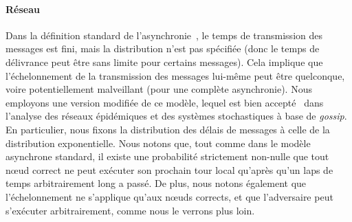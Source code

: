 \documentclass[letterpaper,twocolumn,10pt]{article}
\theoremstyle{definition}
\begin{document}
\paragraph{Réseau} 
Dans la définition standard de l'asynchronie~\cite{ben1983another}, le temps de transmission des messages est fini, mais la distribution n'est pas spécifiée (donc le temps de délivrance peut être sans limite pour certains messages). Cela implique que l'échelonnement de la transmission des messages lui-même peut être quelconque, voire potentiellement malveillant (pour une complète asynchronie).
Nous employons une version modifiée de ce modèle, lequel est bien accepté~\cite{banerjee2014epidemic, ganesh2005effect, draief2006thresholds, keeling2011modeling, liggett1997stochastic} dans l'analyse des réseaux épidémiques et des systèmes stochastiques à base de \emph{gossip}. En particulier, nous fixons la distribution des délais de messages à celle de la distribution exponentielle.
Nous notons que, tout comme dans le modèle asynchrone standard, il existe une probabilité strictement non-nulle que tout nœud correct ne peut exécuter son prochain tour local qu'après qu'un laps de temps arbitrairement long a passé.
De plus, nous notons également que l'échelonnement ne s'applique qu'aux nœuds corrects, et que l'adversaire peut s'exécuter arbitrairement, comme nous le verrons plus loin.
\end{document}
